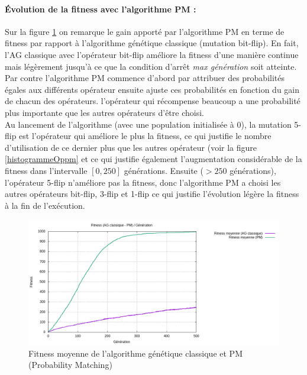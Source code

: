 \documentclass[12pt]{article}
\begin{document}
\paragraph{Évolution de la fitness avec l'algorithme PM : } Sur la figure \ref{curve_ag_pm} on remarque le gain apporté par l'algorithme PM en terme de fitness par rapport à l'algorithme génétique classique (mutation bit-flip). En fait, l'AG classique avec l'opérateur bit-flip améliore la fitness d'une manière continue mais légèrement jusqu'à ce que la condition d'arrêt \emph{max génération} soit atteinte. Par contre l'algorithme PM commence d'abord par attribuer des probabilités égales aux différents opérateur ensuite ajuste ces probabilités en fonction du gain de chacun des opérateurs. l'opérateur qui récompense beaucoup a une probabilité plus importante que les autres opérateurs d'être choisi.\\

Au lancement de l'algorithme (avec une population initialisée à 0), la mutation 5-flip est l'opérateur qui améliore le plus la fitness, ce qui justifie le nombre d'utilisation de ce dernier plus que les autres opérateur (voir la figure \ref{histogrammeOppm} et ce qui justifie également l'augmentation considérable de la fitness dans l'intervalle $ [0, 250] $ générations. Ensuite ($ > 250 $ générations), l'opérateur 5-flip n'améliore pas la fitness, donc l'algorithme PM a choisi les autres opérateurs bit-flip, 3-flip et 1-flip ce qui justifie l'évolution légère la fitness à la fin de l'exécution.

\begin{figure}[H]
	\begin{center}
		\includegraphics[scale=0.5]{img/curve_ag_pm.png}
		\caption{Fitness moyenne de l'algorithme génétique classique et PM (Probability Matching)}
		\label{curve_ag_pm}
	\end{center}
\end{figure}
\end{document}
